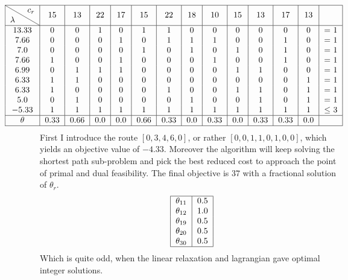 \documentclass{article}
\begin{document}
    \[
        \hspace{-1.5cm}
        \begin{tabular}{ |c| c|c|c|c|c|c|c|c|c|c|c|c|c|c | }
            \hline
            \backslashbox{$\lambda$}{$c_r$} &  15 & 13 & 22 & 17 & 15 & 22 & 18 & 10 & 15 & 13 & 17 & 13 & \\
            \hline
            $13.33$ & 0 & 0 & 1 & 0 & 1 & 1 & 0 & 0 & 0 & 0 & 0 & 0 & = 1\\
            $7.66$ & 0 & 0 & 0 & 1 & 0 & 1 & 1 & 1 & 0 & 0 & 1 & 0 & = 1\\
            $7.0$ & 0 & 0 & 0 & 0 & 1 & 0 & 1 & 0 & 1 & 0 & 1 & 0 & = 1\\
            $7.66$ & 1 & 0 & 0 & 1 & 0 & 0 & 0 & 1 & 0 & 0 & 1 & 0 & = 1\\
            $6.99$ & 0 & 1 & 1 & 1 & 0 & 0 & 0 & 0 & 1 & 1 & 0 & 0 & = 1\\
            $6.33$ & 1 & 1 & 0 & 0 & 0 & 0 & 0 & 0 & 0 & 0 & 0 & 1 & = 1\\
            $6.33$ & 1 & 0 & 0 & 0 & 0 & 1 & 0 & 0 & 1 & 1 & 0 & 1 & = 1\\
            $5.0$ & 0 & 1 & 0 & 0 & 0 & 0 & 1 & 0 & 0 & 1 & 0 & 1 & = 1\\
            $-5.33$ & 1 & 1 & 1 & 1 & 1 & 1 & 1 & 1 & 1 & 1 & 1 & 1 & $\leq $ 3\\
            \hline
            $\theta$ & 0.33 & 0.66 & 0.0 & 0.0 & 0.66 & 0.33 & 0.0 & 0.33 & 0.0 & 0.33 & 0.33 & 0.0 & \\
            \hline
        \end{tabular}
    \]
    First I introduce the route $[0, 3, 4, 6, 0]$, or rather $[0,0,1,1,0,1,0,0]$, which yields an objective value of $-4.33$.
    Moreover the algorithm will keep solving the shortest path sub-problem and pick the best reduced cost to approach the point of primal and dual feasibility.
    The final objective is $37$ with a fractional solution of $\theta_r$.\\
    \[
        \begin{tabular}{ |c|c| }
            \hline
            $\theta_{11}$ & 0.5\\
            $\theta_{12}$ & 1.0\\
            $\theta_{19}$ & 0.5\\
            $\theta_{20}$ & 0.5\\
            $\theta_{30}$ & 0.5\\
            \hline
        \end{tabular}
    \]
    Which is quite odd, when the linear relaxation and lagrangian gave optimal integer solutions.









    \clearpage
    
    
\end{document}
